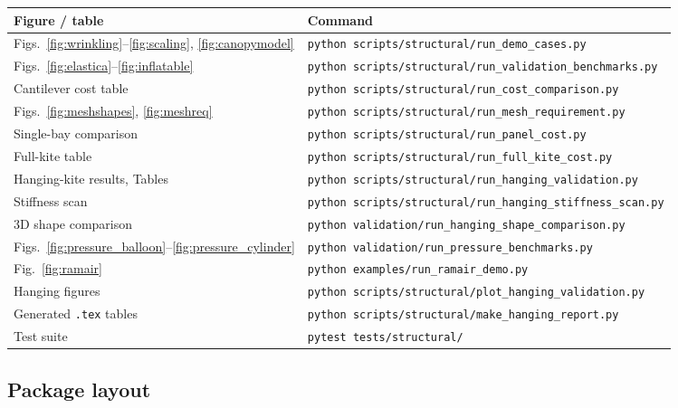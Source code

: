 \documentclass[11pt,a4paper]{article}
\newcommand{\code}[1]{\texttt{\small #1}}
\begin{document}
\begin{table}[H]
\centering
\small
\begin{tabular}{ll}
\toprule
Figure / table & Command\\
\midrule
Figs.~\ref{fig:wrinkling}--\ref{fig:scaling}, \ref{fig:canopymodel}
 & \code{python scripts/structural/run\_demo\_cases.py}\\
Figs.~\ref{fig:elastica}--\ref{fig:inflatable}
 & \code{python scripts/structural/run\_validation\_benchmarks.py}\\
Cantilever cost table & \code{python scripts/structural/run\_cost\_comparison.py}\\
Figs.~\ref{fig:meshshapes}, \ref{fig:meshreq}
 & \code{python scripts/structural/run\_mesh\_requirement.py}\\
Single-bay comparison & \code{python scripts/structural/run\_panel\_cost.py}\\
Full-kite table & \code{python scripts/structural/run\_full\_kite\_cost.py}\\
Hanging-kite results, Tables & \code{python scripts/structural/run\_hanging\_validation.py}\\
Stiffness scan & \code{python scripts/structural/run\_hanging\_stiffness\_scan.py}\\
3D shape comparison & \code{python validation/run\_hanging\_shape\_comparison.py}\\
Figs.~\ref{fig:pressure_balloon}--\ref{fig:pressure_cylinder}
 & \code{python validation/run\_pressure\_benchmarks.py}\\
Fig.~\ref{fig:ramair} & \code{python examples/run\_ramair\_demo.py}\\
Hanging figures & \code{python scripts/structural/plot\_hanging\_validation.py}\\
Generated \code{.tex} tables & \code{python scripts/structural/make\_hanging\_report.py}\\
Test suite & \code{pytest tests/structural/}\\
\bottomrule
\end{tabular}
\end{table}

\subsection{Package layout}
\end{document}
